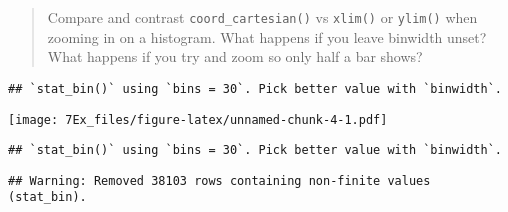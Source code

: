 \documentclass[]{article}
\newenvironment{Shaded}{\begin{snugshade}}{\end{snugshade}}
\newcommand{\DataTypeTok}[1]{\textcolor[rgb]{0.13,0.29,0.53}{#1}}
\newcommand{\DecValTok}[1]{\textcolor[rgb]{0.00,0.00,0.81}{#1}}
\newcommand{\KeywordTok}[1]{\textcolor[rgb]{0.13,0.29,0.53}{\textbf{#1}}}
\newcommand{\NormalTok}[1]{#1}
\newcommand{\OperatorTok}[1]{\textcolor[rgb]{0.81,0.36,0.00}{\textbf{#1}}}
\newcommand{\StringTok}[1]{\textcolor[rgb]{0.31,0.60,0.02}{#1}}
\begin{document}
\begin{quote}
Compare and contrast \texttt{coord\_cartesian()} vs \texttt{xlim()} or
\texttt{ylim()} when zooming in on a histogram. What happens if you
leave binwidth unset? What happens if you try and zoom so only half a
bar shows?
\end{quote}

\begin{Shaded}
\end{Shaded}

\begin{verbatim}
## `stat_bin()` using `bins = 30`. Pick better value with `binwidth`.
\end{verbatim}

\texttt{[image: 7Ex\_files/figure-latex/unnamed-chunk-4-1.pdf]}

\begin{Shaded}
\end{Shaded}

\begin{verbatim}
## `stat_bin()` using `bins = 30`. Pick better value with `binwidth`.
\end{verbatim}

\begin{verbatim}
## Warning: Removed 38103 rows containing non-finite values (stat_bin).
\end{verbatim}
\end{document}
